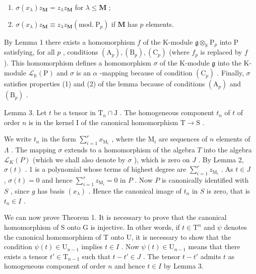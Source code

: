 \begin{enumerate}
\def\labelenumi{(\arabic{enumi})}
\item
  \(\sigma(x_{\lambda})z_{\mathbf{M}} = z_{\lambda}z_{\mathbf{M}}\) for \(\lambda \leqslant \mathbf{M}\) ;
\item
  \(\sigma(x_{\lambda})z_{\mathbf{M}} \equiv z_{\lambda}z_{\mathbf{M}} (\mathrm{mod.~P}_{p})\) if \(\mathbf{M}\) has \(p\) elements.
\end{enumerate}

By Lemma 1 there exists a homomorphism \(f\) of the K-module \(\mathfrak{g} \otimes_{\mathbb{K}} \mathrm{P}_p\) into P satisfying, for all \(p\) , conditions \((\mathrm{A}_p), (\mathrm{B}_p), (\mathrm{C}_p)\) (where \(f_p\) is replaced by \(f\) ). This homomorphism defines a homomorphism \(\sigma\) of the K-module \(\mathfrak{g}\) into the K-module \(\mathcal{L}_{\mathbb{K}}(\mathrm{P})\) and \(\sigma\) is an \(\alpha\) -mapping because of condition \((\mathrm{C}_p)\) . Finally, \(\sigma\) satisfies properties (1) and (2) of the lemma because of conditions \((\mathrm{A}_p)\) and \((\mathrm{B}_p)\) .

Lemma 3. Let \(t\) be a tensor in \(\mathrm{T}_n \cap \mathrm{J}\) . The homogeneous component \(t_n\) of \(t\) of order \(n\) is in the kernel I of the canonical homomorphism \(\mathrm{T} \to \mathrm{S}\) .

We write \(t_n\) in the form \(\sum_{i=1}^{r} x_{\mathrm{M}_i}\) , where the \(\mathrm{M}_i\) are sequences of \(n\) elements of \(\Lambda\) . The mapping \(\sigma\) extends to a homomorphism of the algebra \(T\) into the algebra \(\mathcal{L}_K(P)\) (which we shall also denote by \(\sigma\) ), which is zero on \(J\) . By Lemma 2, \(\sigma(t)\) . 1 is a polynomial whose terms of highest degree are \(\sum_{i=1}^{r} z_{\mathrm{M}_i}\) . As \(t \in J\) , \(\sigma(t) = 0\) and hence \(\sum_{i=1}^{r} z_{\mathrm{M}_i} = 0\) in \(P\) . Now \(P\) is canonically identified with \(S\) , since \(g\) has basis \((x_\lambda)\) . Hence the canonical image of \(t_n\) in \(S\) is zero, that is \(t_n \in I\) .

We can now prove Theorem 1. It is necessary to prove that the canonical homomorphism of S onto G is injective. In other words, if \(t \in \mathrm{T}^n\) and \(\psi\) denotes the canonical homomorphism of T onto U, it is necessary to show that the condition \(\psi(t) \in \mathrm{U}_{n-1}\) implies \(t \in I\) . Now \(\psi(t) \in \mathrm{U}_{n-1}\) means that there exists a tensor \(t' \in \mathrm{T}_{n-1}\) such that \(t - t' \in J\) . The tensor \(t - t'\) admits \(t\) as homogeneous component of order \(n\) and hence \(t \in I\) by Lemma 3.


